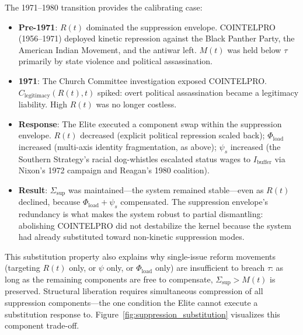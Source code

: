 \documentclass[12pt,openany]{book}
\begin{document}
The 1971--1980 transition provides the calibrating case:
\begin{itemize}[leftmargin=*, nosep]
    \item \textbf{Pre-1971}: $R(t)$ dominated the suppression envelope. COINTELPRO (1956--1971) deployed kinetic repression against the Black Panther Party, the American Indian Movement, and the antiwar left. $M(t)$ was held below $\tau$ primarily by state violence and political assassination.
    \item \textbf{1971}: The Church Committee investigation exposed COINTELPRO. $C_{\text{legitimacy}}(R(t), t)$ spiked: overt political assassination became a legitimacy liability. High $R(t)$ was no longer costless.
    \item \textbf{Response}: The Elite executed a component swap within the suppression envelope. $R(t)$ decreased (explicit political repression scaled back); $\Phi_{\text{load}}$ increased (multi-axis identity fragmentation, as above); $\psi_s$ increased (the Southern Strategy's racial dog-whistles escalated status wages to $I_{\text{buffer}}$ via Nixon's 1972 campaign and Reagan's 1980 coalition).
    \item \textbf{Result}: $\Sigma_{\text{sup}}$ was maintained---the system remained stable---even as $R(t)$ declined, because $\Phi_{\text{load}} + \psi_s$ compensated. The suppression envelope's redundancy is what makes the system robust to partial dismantling: abolishing COINTELPRO did not destabilize the kernel because the system had already substituted toward non-kinetic suppression modes.
\end{itemize}

This substitution property also explains why single-issue reform movements (targeting $R(t)$ only, or $\psi$ only, or $\Phi_{\text{load}}$ only) are insufficient to breach $\tau$: as long as the remaining components are free to compensate, $\Sigma_{\text{sup}} > M(t)$ is preserved. Structural liberation requires simultaneous compression of all suppression components---the one condition the Elite cannot execute a substitution response to. Figure~\ref{fig:suppression_substitution} visualizes this component trade-off.
\end{document}
